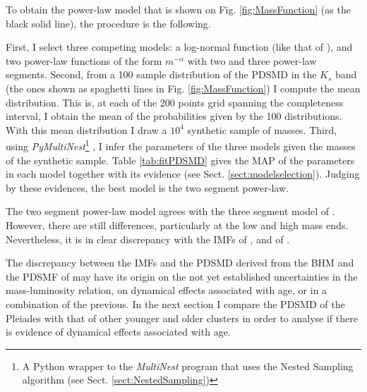 To obtain the power-law model that is shown on Fig. \ref{fig:MassFunction} (as the black solid line), the procedure is the following. 

First, I select three competing models: a log-normal function (like that of \citet{Chabrier2003,Chabrier2005}), and two power-law functions of the form $m^{-\alpha}$ with two and three power-law segments. Second, from a 100 sample distribution of the PDSMD in the $K_s$ band (the ones shown as spaghetti lines in Fig. \ref{fig:MassFunction}) I compute the mean distribution. This is, at each of the 200 points grid spanning the completeness interval, I obtain the mean of the probabilities given by the 100 distributions. With this mean distribution I draw a $10^4$ synthetic sample of masses. Third, using \emph{PyMultiNest}\footnote{A Python wrapper to the \emph{MultiNest} program that uses the Nested Sampling algorithm (see Sect. \ref{sect:NestedSampling})} \citep{Buchner2014}, I infer the parameters of the three models given the masses of the synthetic sample. Table \ref{tab:fitPDSMD} gives the MAP of the parameters in each model together with its evidence (see Sect. \ref{sect:modelselection}). Judging by these evidences, the best model is the two segment power-law. 

The two segment power-law model agrees with the three segment model of \citet{Bouy2015}. However, there are still differences, particularly at the low and high mass ends. Nevertheless, it is in clear discrepancy with the IMFs of \citet{Chabrier2005},  \cite[$m_c=0.25_{-0.016}^{+0.021}$ and $\sigma=0.55_{-0.01}^{+0.05}$, the uncertainties are those reported by][for single objects]{Chabrier2003} and of \citet{Thies2007}. 

The discrepancy between the IMFs and the PDSMD derived from the BHM and the PDSMF of \citet{Bouy2015} may have its origin on the not yet established uncertainties in the mass-luminosity relation, on dynamical effects associated with age, or in a combination of the previous. In the next section I compare the PDSMD of the Pleiades with that of other younger and older clusters in order to analyse if there is evidence of dynamical effects associated with age.


